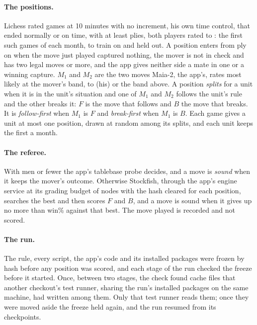 \documentclass[11pt]{article}
\begin{document}
\paragraph{The positions.} Lichess rated games at 10 minutes with no increment, his own time
control, that ended normally or on time, with at least \MinPlies{} plies, both players rated
\BandLow{} to \BandHigh{}: the first \PerMonth{} such games of each month, \TrainMonths{} to train
on and \HeldMonth{} held out. A position enters from ply \MinPly{} on when the move just played
captured nothing, the mover is not in check and has two legal moves or more, and the app gives
neither side a mate in one or a winning capture. $M_1$ and $M_2$ are the two moves Maia-2, the
app's, rates most likely at the mover's band, \BandLow{} to \HisHigh{} (his) or the band above. A
position \emph{splits} for a unit when it is in the unit's situation and one of $M_1$ and $M_2$
follows the unit's rule and the other breaks it: $F$ is the move that follows and $B$ the move that
breaks. It is \emph{follow-first} when $M_1$ is $F$ and \emph{break-first} when $M_1$ is $B$. Each
game gives a unit at most one position, drawn at random among its splits, and each unit keeps the
first \Cap{} a month.

\paragraph{The referee.} With \TablebaseMen{} men or fewer the app's tablebase probe decides, and a
move is \emph{sound} when it keeps the mover's outcome. Otherwise Stockfish, through the app's
engine service at its grading budget of \Nodes{} nodes with the hash cleared for each position,
searches the best and then scores $F$ and $B$, and a move is sound when it gives up no more than
\WindowWp{} win\% against that best. The move played is recorded and not scored.

\paragraph{The run.} The rule, every script, the app's code and its installed packages were frozen
by hash before any position was scored, and each stage of the run checked the freeze before it
started. Once, between two stages, the check found cache files that another checkout's test runner,
sharing the run's installed packages on the same machine, had written among them. Only that test
runner reads them; once they were moved aside the freeze held again, and the run resumed from its
checkpoints.
\end{document}
